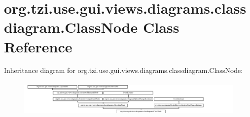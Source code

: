 \hypertarget{classorg_1_1tzi_1_1use_1_1gui_1_1views_1_1diagrams_1_1classdiagram_1_1_class_node}{\section{org.\-tzi.\-use.\-gui.\-views.\-diagrams.\-classdiagram.\-Class\-Node Class Reference}
\label{classorg_1_1tzi_1_1use_1_1gui_1_1views_1_1diagrams_1_1classdiagram_1_1_class_node}
}
Inheritance diagram for org.\-tzi.\-use.\-gui.\-views.\-diagrams.\-classdiagram.\-Class\-Node\-:\begin{figure}[H]
\begin{center}
\leavevmode
\includegraphics[height=1.866667cm]{classorg_1_1tzi_1_1use_1_1gui_1_1views_1_1diagrams_1_1classdiagram_1_1_class_node}
\end{center}
\end{figure}
